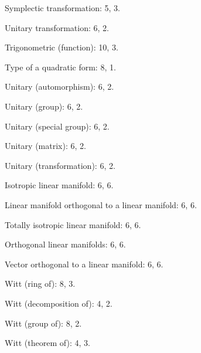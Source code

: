 Symplectic transformation: 5, 3.

Unitary transformation: 6, 2.

Trigonometric (function): 10, 3.

Type of a quadratic form: 8, 1.

Unitary (automorphism): 6, 2.

Unitary (group): 6, 2.

Unitary (special group): 6, 2.

Unitary (matrix): 6, 2.

Unitary (transformation): 6, 2.

Isotropic linear manifold: 6, 6.

Linear manifold orthogonal to a linear manifold: 6, 6.

Totally isotropic linear manifold: 6, 6.

Orthogonal linear manifolds: 6, 6.

Vector orthogonal to a linear manifold: 6, 6.

Witt (ring of): 8, 3.

Witt (decomposition of): 4, 2.

Witt (group of): 8, 2.

Witt (theorem of): 4, 3.

